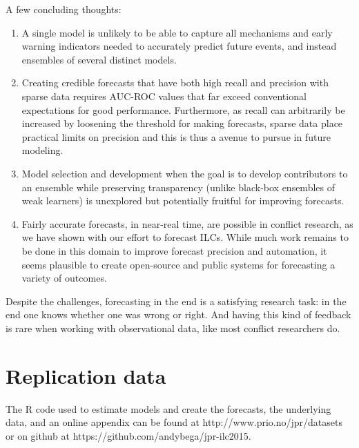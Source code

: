 \documentclass[pdftex,11pt]{article}
\begin{document}
A few concluding thoughts:
\begin{enumerate}
\item A single model is unlikely to be able to capture all mechanisms and early warning indicators needed to accurately predict future events, and instead ensembles of several distinct models.
\item Creating credible forecasts that have both high recall and precision with sparse data requires AUC-ROC values that far exceed conventional expectations for good performance. Furthermore, as recall can arbitrarily be increased by loosening the threshold for making forecasts, sparse data place practical limits on precision and this is thus a avenue to pursue in future modeling. 
\item Model selection and development when the goal is to develop contributors to an ensemble while preserving transparency (unlike black-box ensembles of weak learners) is unexplored but potentially fruitful for improving forecasts. 
\item Fairly accurate forecasts, in near-real time, are possible in conflict research, as we have shown with our effort to forecast ILCs. While much work remains to be done in this domain to improve forecast precision and automation, it seems plausible to create open-source and public systems for forecasting a variety of outcomes. 
\end{enumerate}

Despite the challenges, forecasting in the end is a satisfying research task: in the end one knows whether one was wrong or right. And having this kind of feedback is rare when working with observational data, like most conflict researchers do.

\section{Replication data}

The R code used to estimate models and create the forecasts, the underlying data, and an online appendix can be found at http://www.prio.no/jpr/datasets or on github at https://github.com/andybega/jpr-ilc2015.


\clearpage

%
%


%

%
%
\clearpage
{}
\appendix
\end{document}

